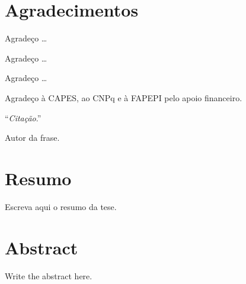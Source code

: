 \clearpage

\chapter*{Agradecimentos}

\noindent Agradeço \dots %

\vspace{8pt}
\noindent Agradeço \dots %

\vspace{8pt}
\noindent Agradeço \dots %

\vspace{8pt}
\noindent Agradeço à CAPES, ao CNPq e à FAPEPI pelo apoio financeiro. %

\clearpage

\thispagestyle{empty}
\vspace*{13cm}

\hfill
\begin{minipage}{0.60\textwidth}
\raggedleft
``{\em Citação}.'' %

\vspace{6pt}
Autor da frase. %
\end{minipage}

\clearpage

\chapter*{Resumo}

Escreva aqui o resumo da tese. %

\clearpage

\chapter*{Abstract}

Write the abstract here. %

\clearpage

\tableofcontents

\clearpage
{}